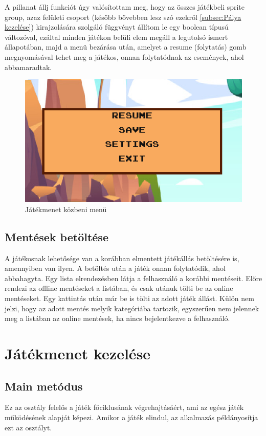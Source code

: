 A pillanat állj funkciót úgy valósítottam meg, hogy az összes játékbeli sprite group, azaz felületi csoport (később bővebben lesz szó ezekről \ref{subsec:Pálya kezelése}) kirajzolására szolgáló függvényt állítom le egy boolean típusú változóval, ezáltal minden játékon belüli elem megáll a legutolsó ismert állapotában, majd a menü bezárása után, amelyet a resume (folytatás) gomb megnyomásával tehet meg a játékos, onnan folytatódnak az események, ahol abbamaradtak.


\begin{figure}[H]
    \centering
    \includegraphics[width=12.0truecm]{images/ingamemenu.png}
    \caption{Játékmenet közbeni menü}
    \label{fig:Játékmenet közbeni menü}
\end{figure}

\subsection{Mentések betöltése}
\indent \indent A játékosnak lehetősége van a korábban elmentett játékállás betöltésére is, amennyiben van ilyen. A betöltés után a játék onnan folytatódik, ahol abbahagyta. Egy lista elrendezésben látja a felhasználó a korábbi mentéseit. Előre rendezi az offline mentéseket a listában, és csak utánuk tölti be az online mentéseket. Egy kattintás után már be is tölti az adott játék állást. Külön nem jelzi, hogy az adott mentés melyik kategóriába tartozik, egyszerűen nem jelennek meg a listában az online mentések, ha nincs bejelentkezve a felhasználó.

\section{Játékmenet kezelése}

\subsection{Main metódus}
\indent \indent Ez az osztály felelős a játék főciklusának végrehajtásáért, ami az egész játék működésének alapját képezi. Amikor a játék elindul, az alkalmazás példányosítja ezt az osztályt.

